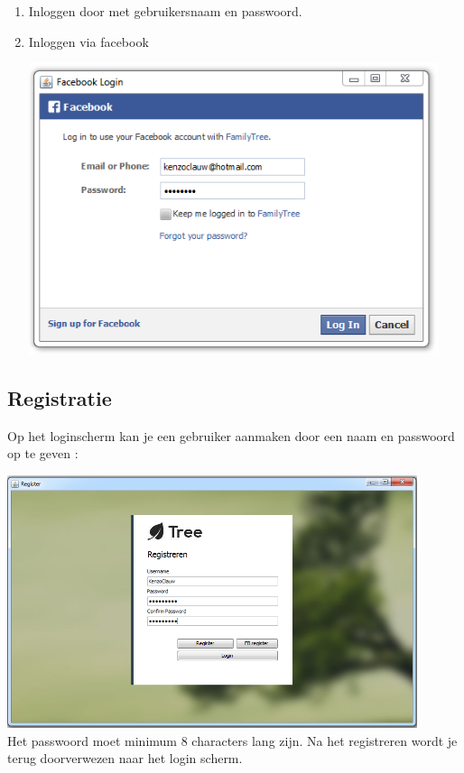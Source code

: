 \documentclass[pdftex,a4paper,12pt,twoside]{report}
\begin{document}
\begin{enumerate}
\item \label{it:first}Inloggen door met gebruikersnaam en passwoord.



\item \label{it:first}Inloggen via facebook

\includegraphics[width=12cm]{images/facebook.png}\\[.5cm]
\end{enumerate}

\subsection{Registratie}
Op het loginscherm kan je een gebruiker aanmaken door een naam en passwoord op te geven : 

\includegraphics[width=12cm]{images/register.png}\\[.5cm]
Het passwoord moet minimum 8 characters lang zijn.
Na het registreren wordt je terug doorverwezen naar het login scherm.
\end{document}
